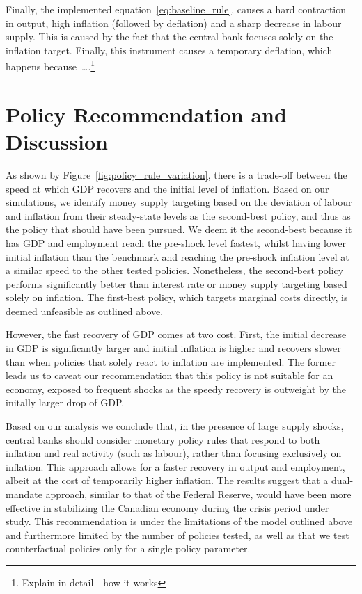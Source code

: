 \documentclass[12pt]{article}
\begin{document}
Finally, the implemented equation~\ref{eq:baseline_rule}, causes a hard contraction in output, high inflation (followed by deflation) and a sharp decrease in labour supply. This is caused by the fact that the central bank focuses solely on the inflation target. Finally, this instrument causes a temporary deflation, which happens because\ \dots.\footnote{Explain in detail - how it works}




\newpage
\section{Policy Recommendation and Discussion }\label{s:discussion}

As shown by Figure~\ref{fig:policy_rule_variation}, there is a trade-off between the speed at which GDP recovers and the initial level of inflation. Based on our simulations, we identify money supply targeting based on the deviation of labour and inflation from their steady-state levels as the second-best policy, and thus as the policy that should have been pursued. We deem it the second-best because it has GDP and employment reach the pre-shock level fastest, whilst having lower initial inflation than the benchmark and reaching the pre-shock inflation level at a similar speed to the other tested policies. Nonetheless, the second-best policy performs significantly better than interest rate or money supply targeting based solely on inflation. The first-best policy, which targets marginal costs directly, is deemed unfeasible as outlined above. 

However, the fast recovery of GDP comes at two cost. First, the initial decrease in GDP is significantly larger and initial inflation is higher and recovers slower than when policies that solely react to inflation are implemented. The former leads us to caveat our recommendation that this policy is not suitable for an economy, exposed to frequent shocks as the speedy recovery is outweight by the initally larger drop of GDP. 

Based on our analysis we conclude that, in the presence of large supply shocks, central banks should consider monetary policy rules that respond to both inflation and real activity (such as labour), rather than focusing exclusively on inflation. This approach allows for a faster recovery in output and employment, albeit at the cost of temporarily higher inflation. The results suggest that a dual-mandate approach, similar to that of the Federal Reserve, would have been more effective in stabilizing the Canadian economy during the crisis period under study. This recommendation is under the limitations of the model outlined above and furthermore limited by the number of policies tested, as well as that we test counterfactual policies only for a single policy parameter. 
\end{document}
